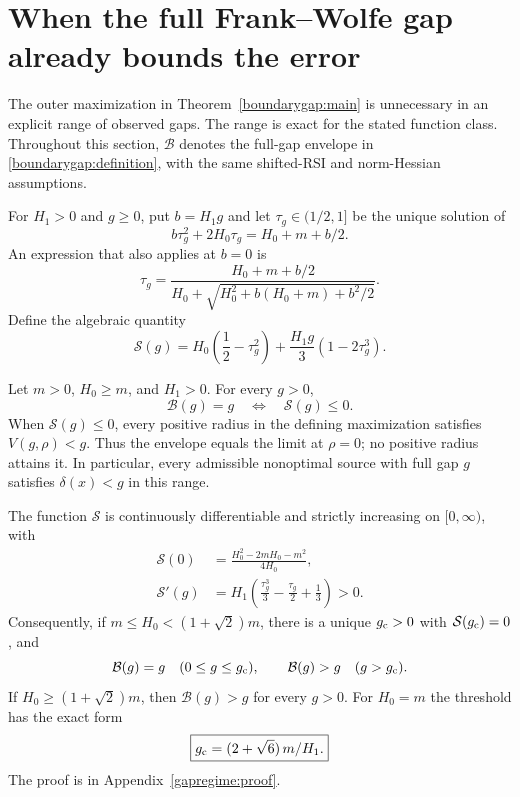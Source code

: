 \section{When the full Frank--Wolfe gap already bounds the error}
\label{gapregime:section}
The outer maximization in Theorem~\ref{boundarygap:main} is unnecessary
in an explicit range of observed gaps.  The range is exact for the
stated function class.  Throughout this section, $\mathcal B$ denotes
the full-gap envelope in \eqref{boundarygap:definition}, with the
same shifted-RSI and norm-Hessian assumptions.

For $H_1>0$ and $g\ge0$, put $b=H_1g$ and let $\tau_g\in(1/2,1]$
be the unique solution of
\begin{equation}\label{gapregime:switch}
 b\tau_g^2+2H_0\tau_g=H_0+m+b/2.
\end{equation}
An expression that also applies at $b=0$ is
\begin{equation}\label{gapregime:tau}
 \tau_g=
 \frac{H_0+m+b/2}{H_0+\sqrt{H_0^2+b(H_0+m)+b^2/2}}.
\end{equation}
Define the algebraic quantity
\begin{equation}\label{gapregime:coefficient}
 \mathcal S(g)=H_0\left(\frac12-\tau_g^2\right)
       +\frac{H_1g}{3}\left(1-2\tau_g^3\right).
\end{equation}

\begin{theorem}
\label{gapregime:main}
Let $m>0$, $H_0\ge m$, and $H_1>0$.  For every $g>0$,
\begin{equation}\label{gapregime:equivalence}
 \boxed{\quad \mathcal B(g)=g
              \quad\Longleftrightarrow\quad \mathcal S(g)\le0.\quad}
\end{equation}
When $\mathcal S(g)\le0$, every positive radius in the defining
maximization satisfies $V(g,\rho)<g$.  Thus the envelope equals the
limit at $\rho=0$; no positive radius attains it.  In particular,
every admissible nonoptimal source with full gap $g$ satisfies
$\delta(x)<g$ in this range.

The function $\mathcal S$ is continuously differentiable and strictly
increasing on $[0,\infty)$, with
\begin{align}
 \mathcal S(0)
   &=\frac{H_0^2-2mH_0-m^2}{4H_0},
       \label{gapregime:initial}\\
 \mathcal S'(g)
   &=H_1\left(\frac{\tau_g^3}{3}
                    -\frac{\tau_g}{2}+\frac13\right)>0.
       \label{gapregime:derivative}
\end{align}
Consequently, if $m\le H_0<(1+\sqrt2)m$, there is a unique
$g_{\rm c}>0$ with $\mathcal S(g_{\rm c})=0$, and
\[
 \mathcal B(g)=g\quad(0\le g\le g_{\rm c}),\qquad
 \mathcal B(g)>g\quad(g>g_{\rm c}).
\]
If $H_0\ge(1+\sqrt2)m$, then $\mathcal B(g)>g$ for every $g>0$.
For $H_0=m$ the threshold has the exact form
\begin{equation}\label{gapregime:unit-threshold}
 \boxed{g_{\rm c}=(2+\sqrt6)\,m/H_1.}
\end{equation}
The proof is in Appendix~\ref{gapregime:proof}.
\end{theorem}

